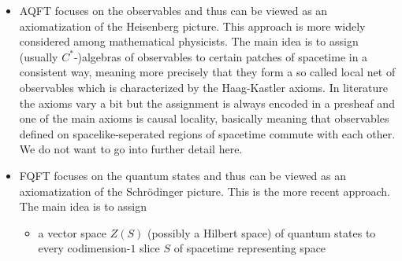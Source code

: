 \begin{itemize}
\item
AQFT focuses on the observables and thus can be viewed as an axiomatization of the Heisenberg picture. This approach is more widely considered among mathematical physicists. The main idea is to assign (usually $C^{\ast}$-)algebras of observables to certain patches of spacetime in a consistent way, meaning more precisely that they form a so called local net of  observables which is characterized by the Haag-Kastler axioms. In literature the axioms vary a bit but the assignment is always encoded in a presheaf and one of the main axioms is causal locality, basically meaning that observables defined on spacelike-seperated regions of spacetime commute with each other. We do not want to go into further detail here.

\item
FQFT focuses on the quantum states and thus can be viewed as an axiomatization of the Schr{\"o}dinger picture. This is the more recent approach. The main idea is to assign
\begin{itemize}
\item
a vector space $Z(S)$ (possibly a Hilbert space) of quantum states to every codimension-$1$ slice $S$ of spacetime representing space


\end{itemize}
\end{itemize}
